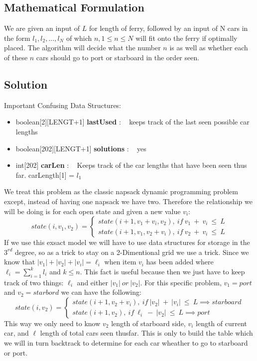 \documentclass[12pt]{article}
\begin{document}

\newpage

\subsection{Mathematical Formulation}
We are given an input of $L$ for length of ferry, followed by an input of N cars in the
form $l_1, l_2, ... , l_N$ of which $n, 1 \leq n \leq N$ will fit onto the ferry if optimally placed.
The algorithm will decide what the number $n$ is as well as whether each of these $n$ cars
should go to port or starboard in the order seen.

\subsection{Solution}
Important Confusing Data Structures:
\begin{itemize}
    \item boolean[2][LENGT+1] \textbf{lastUsed} : ~ keeps track of the last seen possible car lengths
    \item boolean[202][LENGT+1] \textbf{solutions} : ~ yes
    \item int[202] \textbf{carLen} : ~ Keeps track of the car lengths that have been seen thus far. carLength[1] = $l_1$
\end{itemize}

We treat this problem as the classic napsack dynamic programming problem except,
instead of having one napsack we have two. Therefore the relationship we will
be doing is for each open state and given a new value $v_i$:
\[
state(i, v_1, v_2) =
    \begin{cases}
        state(i+1, v_1 + v_i, v_2),\ if\ v_1\ +\ v_i\ \leq\ L \\
        state(i+1, v_1, v_2 + v_i),\ if\ v_2\ +\ v_i\ \leq\ L
    \end{cases}
\]
If we use this exsact model we will have to use data structures for storage in the $3^{rd}$
degree, so as a trick to stay on a 2-Dimentional grid we use a trick. Since we know
that $|v_1| + |v_2| + |v_i| = \ell_i$ when item $v_i$ has been added where $\ell_i = \sum\limits_{i=1}^{k} l_i$ and $k \leq n$. This
fact is useful because then we just have to keep track of two things: $\ell_i$ and either
$|v_1|\ or\ |v_2|$. For this specific problem, $v_1 = port$ and $v_2 = starbord$ we can have the
following:
\[
state(i, v_2) =
    \begin{cases}
        state(i+1, v_2 + v_i),\ if\ |v_2|\ +\ |v_i|\ \leq\ L \implies starboard\\
        state(i+1, v_2),\ if\ \ell_i\ -\ |v_2|\ \leq\ L \implies port
    \end{cases}
\]
This way we only need to know $v_2$ length of starboard side, $v_i$ length of current car,
and $\ell$ length of total cars seen thusfar. This is only to build the table which we will
in turn backtrack to determine for each car wheather to go to starboard or port.
\end{document}
